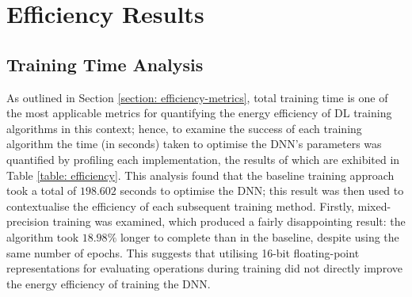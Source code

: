 \documentclass[a4paper, 11pt]{report}
\begin{document}
    \section{Efficiency Results}

    \subsection{Training Time Analysis}

    As outlined in Section \ref{section: efficiency-metrics}, total training time is one of the most applicable metrics for quantifying the energy efficiency of DL training algorithms in this context; hence, to examine the success of each training algorithm the time (in seconds) taken to optimise the DNN's parameters was quantified by profiling each implementation, the results of which are exhibited in Table \ref{table: efficiency}. This analysis found that the baseline training approach took a total of $198.602$ seconds to optimise the DNN; this result was then used to contextualise the efficiency of each subsequent training method. Firstly, mixed-precision training was examined, which produced a fairly disappointing result: the algorithm took $18.98\%$ longer to complete than in the baseline, despite using the same number of epochs. This suggests that utilising 16-bit floating-point representations for evaluating operations during training did not directly improve the energy efficiency of training the DNN.
\end{document}
